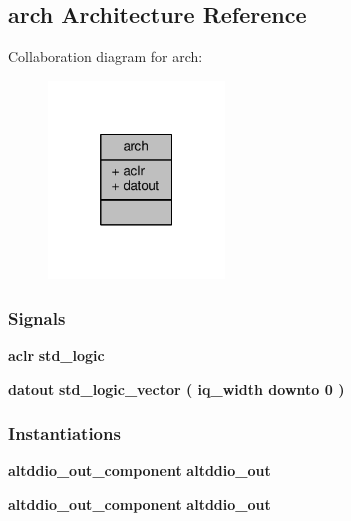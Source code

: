 \subsection{arch Architecture Reference}
\label{classlms7002__ddout_1_1arch}


Collaboration diagram for arch\+:\nopagebreak
\begin{figure}[H]
\begin{center}
\leavevmode
\includegraphics[width=133pt]{d3/d6a/classlms7002__ddout_1_1arch__coll__graph}
\end{center}
\end{figure}
\subsubsection*{Signals}
 \begin{DoxyCompactItemize}
\item 
{\bf aclr} {\bfseries \textcolor{comment}{std\+\_\+logic}\textcolor{vhdlchar}{ }} 
\item 
{\bf datout} {\bfseries \textcolor{comment}{std\+\_\+logic\+\_\+vector}\textcolor{vhdlchar}{ }\textcolor{vhdlchar}{(}\textcolor{vhdlchar}{ }\textcolor{vhdlchar}{ }\textcolor{vhdlchar}{ }\textcolor{vhdlchar}{ }{\bfseries {\bf iq\+\_\+width}} \textcolor{vhdlchar}{ }\textcolor{keywordflow}{downto}\textcolor{vhdlchar}{ }\textcolor{vhdlchar}{ } \textcolor{vhdldigit}{0} \textcolor{vhdlchar}{ }\textcolor{vhdlchar}{)}\textcolor{vhdlchar}{ }} 
\end{DoxyCompactItemize}
\subsubsection*{Instantiations}
 \begin{DoxyCompactItemize}
\item 
{\bf altddio\+\_\+out\+\_\+component}  {\bfseries altddio\+\_\+out}   
\item 
{\bf altddio\+\_\+out\+\_\+component}  {\bfseries altddio\+\_\+out}   
\end{DoxyCompactItemize}



